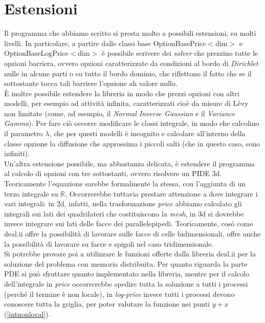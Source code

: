 \documentclass[a4paper,10pt]{report}
\theoremstyle{plain}
\theoremstyle{definition}
\theoremstyle{remark}
\begin{document}
\chapter{Estensioni}
Il programma che abbiamo scritto si presta molto a possibili estensioni, su molti livelli. In particolare, a partire dalle classi base \textsf{OptionBasePrice$<$dim$>$} e \textsf{OptionBaseLogPrice$<$dim$>$} \`e possibile scrivere dei \emph{solver} che prezzino tutte le opzioni barriera, ovvero opzioni caratterizzate da condizioni al bordo di \emph{Dirichlet} nulle in alcune parti o su tutto il bordo dominio, che riflettono il fatto che se il sottostante tocca tali barriere l'opzione ah valore nullo.\\\`E inoltre possibile estendere la libreria in modo che prezzi opzioni con altri modelli, per esempio ad attivit\`a infinita, caratterizzati cio\`e da misure di L\'evy non limitate (come, ad esempio, il \emph{Normal Inverse Gaussian} e il \emph{Variance Gamma}). Per fare ci\`o occorre modificare le classi integrale, in modo che calcolino il parametro $\lambda$, che per questi modelli \`e incognito e calcolare all'interno della classe opzione la diffusione che approssima i piccoli salti (che in questo caso, sono infiniti).\\Un'altra estensione possibile, ma abbastanza delicata, \`e estendere il programma al calcolo di opzioni con tre sottostanti, ovvero risolvere un PIDE 3d. Teoricamente l'equazione sarebbe formalmente la stessa, con l'aggiunta di un terzo integrale su $\mathbb{R}$. Occorrerebbe tuttavia prestare attenzione a dove integrare i vari integrali: in 2d, infatti, nella trasformazione \emph{price} abbiamo calcolato gli integrali sui lati dei quadrilateri che costituiscono la \emph{mesh}, in 3d si dovrebbe invece integrare sui lati delle facce dei parallelepipedi. Teoricamente, cosò come \textsf{deal.ii} offre la possibilità di lavorare sulle facce di celle bidimensionali, offre anche la possibilità di lavorare su facce e spigoli nel caso tridimensionale. \\Si potrebbe provare poi a utilizzare le funzioni offerte dalla libreria \textsf{deal.ii} per la soluzione del problema con memoria distribuita. Per quanto riguarda la parte PDE si pu\`o sfruttare quanto implementato nella libreria, mentre per il calcolo dell'integrale in \emph{price} occorrerebbe spedire tutta la soluzione a tutti i processi (perch\'e il termine \`e non locale), in \emph{log-price} invece tutti i processi devono conoscere tutta la griglia, per poter valutare la funzione nei punti $y+x$ (\ref{intnonlocal}).\\\\
\clearpage
{}


\end{document}
